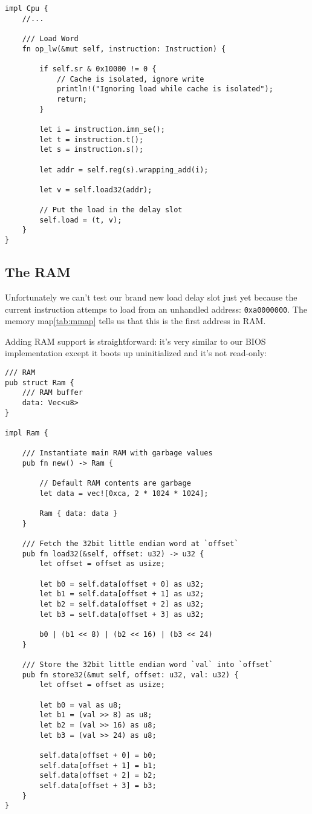 \documentclass[a4paper]{article}
\newcommand{\code}[1] {\texttt{#1}}
\begin{document}
\begin{lstlisting}
impl Cpu {
    //...

    /// Load Word
    fn op_lw(&mut self, instruction: Instruction) {

        if self.sr & 0x10000 != 0 {
            // Cache is isolated, ignore write
            println!("Ignoring load while cache is isolated");
            return;
        }

        let i = instruction.imm_se();
        let t = instruction.t();
        let s = instruction.s();

        let addr = self.reg(s).wrapping_add(i);

        let v = self.load32(addr);

        // Put the load in the delay slot
        self.load = (t, v);
    }
}
\end{lstlisting}

\subsection{The RAM}

\label{sec:ram}

Unfortunately we can't test our brand new load delay slot just yet
because the current instruction attemps to load from an unhandled
address: \code{0xa0000000}. The memory map\ref{tab:mmap} tells us that
this is the first address in RAM.

Adding RAM support is straightforward: it's very similar to our BIOS
implementation except it boots up uninitialized and it's not
read-only:

\begin{lstlisting}
/// RAM
pub struct Ram {
    /// RAM buffer
    data: Vec<u8>
}

impl Ram {

    /// Instantiate main RAM with garbage values
    pub fn new() -> Ram {

        // Default RAM contents are garbage
        let data = vec![0xca, 2 * 1024 * 1024];

        Ram { data: data }
    }

    /// Fetch the 32bit little endian word at `offset`
    pub fn load32(&self, offset: u32) -> u32 {
        let offset = offset as usize;

        let b0 = self.data[offset + 0] as u32;
        let b1 = self.data[offset + 1] as u32;
        let b2 = self.data[offset + 2] as u32;
        let b3 = self.data[offset + 3] as u32;

        b0 | (b1 << 8) | (b2 << 16) | (b3 << 24)
    }

    /// Store the 32bit little endian word `val` into `offset`
    pub fn store32(&mut self, offset: u32, val: u32) {
        let offset = offset as usize;

        let b0 = val as u8;
        let b1 = (val >> 8) as u8;
        let b2 = (val >> 16) as u8;
        let b3 = (val >> 24) as u8;

        self.data[offset + 0] = b0;
        self.data[offset + 1] = b1;
        self.data[offset + 2] = b2;
        self.data[offset + 3] = b3;
    }
}
\end{lstlisting}
\end{document}
